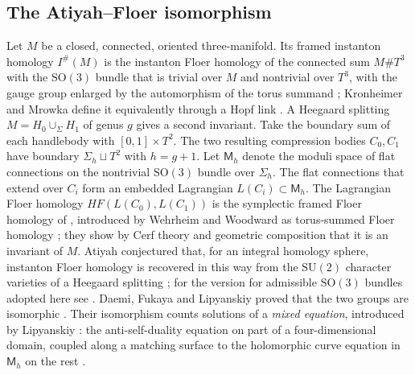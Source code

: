 \documentclass[11pt]{amsart}
\theoremstyle{definition}
\theoremstyle{remark}
\theoremstyle{plain}
\numberwithin{equation}{section}
\newcommand{\SO}{\mathrm{SO}}
\newcommand{\SU}{\mathrm{SU}}
\newcommand{\Ish}{I^{\#}}
\newcommand{\HF}{\mathit{HF}}
\newcommand{\Msf}{\mathsf{M}}
\begin{document}
\subsection{The Atiyah--Floer isomorphism}

Let $M$ be a closed, connected, oriented three-manifold. Its framed
instanton homology $\Ish(M)$ is the instanton Floer homology of the
connected sum $M\#T^3$ with the $\SO(3)$ bundle that is trivial over $M$
and nontrivial over $T^3$, with the gauge group enlarged by the automorphism of the
torus summand \cite[Section~7]{Scaduto}; Kronheimer and Mrowka define it equivalently
through a Hopf link \cite{KM-unknot}. A Heegaard
splitting $M=H_0\cup_\Sigma H_1$ of genus $g$ gives a second invariant.
Take the boundary sum of each handlebody with $[0,1]\times T^2$. The
two resulting compression bodies $C_0,C_1$ have boundary
$\Sigma_h\sqcup T^2$ with $h=g+1$. Let $\Msf_h$ denote the moduli space
of flat connections on the nontrivial $\SO(3)$ bundle over $\Sigma_h$.
The flat connections that extend over $C_i$ form an embedded Lagrangian
$L(C_i)\subset\Msf_h$. The Lagrangian Floer homology
$\HF(L(C_0),L(C_1))$ is the symplectic framed Floer homology of \cite{DFL},
introduced by Wehrheim and Woodward as torus-summed Floer homology
\cite[Definition~4.4.1]{WW-fft}; they show by Cerf theory and geometric composition
that it is an invariant of $M$. Atiyah conjectured that, for an integral homology
sphere, instanton Floer homology \cite{Floer} is recovered in this way from the
$\SU(2)$ character varieties of a Heegaard splitting \cite{Atiyah}; for the version
for admissible $\SO(3)$ bundles adopted here see \cite[Section~10]{DF}. Daemi, Fukaya and Lipyanskiy proved that the two groups are
isomorphic \cite[Theorem~3]{DFL}. Their isomorphism counts solutions of a
\emph{mixed equation}, introduced by Lipyanskiy \cite{Lipyanskiy}: the
anti-self-duality equation on part of a four-dimensional domain, coupled along
a matching surface to the holomorphic curve equation in $\Msf_h$ on the rest
\cite{DFL, DFL-mixed}.
\end{document}
